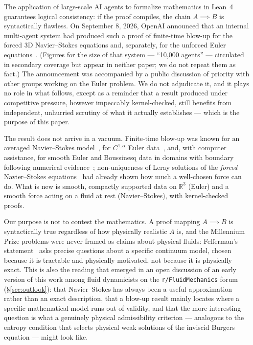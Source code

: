 \documentclass[11pt,a4paper]{article}
\begin{document}
The application of large-scale AI agents to formalize mathematics in Lean~4 guarantees logical
consistency: if the proof compiles, the chain $A \implies B$ is syntactically flawless. On September
8, 2026, OpenAI announced that an internal multi-agent system had produced such a proof of
finite-time blow-up for the forced 3D Navier--Stokes equations and, separately, for the unforced
Euler equations~\cite{OpenAI2026,OpenAIEuler2026,OpenAIAnnouncement2026}. (Figures for the size of
that system --- ``10{,}000 agents'' --- circulated in secondary coverage but appear in neither
paper; we do not repeat them as fact.) The announcement was accompanied by a public discussion of
priority with other groups working on the Euler problem. We do not adjudicate it, and it plays no
role in what follows, except as a reminder that a result produced under competitive pressure, however
impeccably kernel-checked, still benefits from independent, unhurried scrutiny of what it actually
establishes --- which is the purpose of this paper.

The result does not arrive in a vacuum. Finite-time blow-up was known for an averaged
Navier--Stokes model~\cite{Tao2016}, for $C^{1,\alpha}$ Euler data~\cite{Elgindi2021}, and, with
computer assistance, for smooth Euler and Boussinesq data in domains with
boundary~\cite{ChenHou2022} following numerical evidence~\cite{HouLuo2014}; non-uniqueness of Leray
solutions of the \emph{forced} Navier--Stokes equations~\cite{ABC2022} had already shown how much a
well-chosen force can do. What is new is smooth, compactly supported data on $\mathbb{R}^3$ (Euler)
and a smooth force acting on a fluid at rest (Navier--Stokes), with kernel-checked proofs.

Our purpose is not to contest the mathematics. A proof mapping $A \implies B$ is syntactically true
regardless of how physically realistic $A$ is, and the Millennium Prize problems were never framed as
claims about physical fluids: Fefferman's statement~\cite{Fefferman2000} asks precise questions about
a specific continuum model, chosen because it is tractable and physically motivated, not because it
is physically exact. This is also the reading that emerged in an open discussion of an early
version of this work among fluid dynamicists on the \texttt{r/FluidMechanics}
forum~\cite{RedditFluidMech2026} (\S\ref{sec:outlook}): that Navier--Stokes has always been a useful
approximation rather than an exact description, that a blow-up result mainly locates where a
specific mathematical model runs out of validity, and that the more interesting question is what a
genuinely physical admissibility criterion --- analogous to the entropy condition that selects
physical weak solutions of the inviscid Burgers equation --- might look like.
\end{document}
